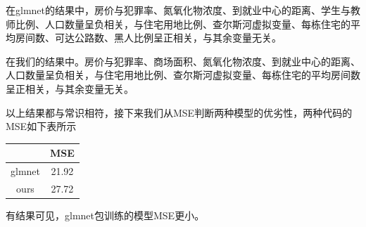     在glmnet的结果中，房价与犯罪率、氮氧化物浓度、到就业中心的距离、学生与教师比例、人口数量呈负相关，与住宅用地比例、查尔斯河虚拟变量、每栋住宅的平均房间数、可达公路数、黑人比例呈正相关，与其余变量无关。

    在我们的结果中。房价与犯罪率、商场面积、氮氧化物浓度、到就业中心的距离、人口数量呈负相关，与住宅用地比例、查尔斯河虚拟变量、每栋住宅的平均房间数呈正相关，与其余变量无关。

    以上结果都与常识相符，接下来我们从MSE判断两种模型的优劣性，两种代码的MSE如下表所示
    \begin{table}[]
        \begin{tabular}{|c|c|}
        \hline
               & MSE   \\ \hline
        glmnet & 21.92 \\ \hline
        ours   & 27.72 \\ \hline
        \end{tabular}
    \end{table}
    有结果可见，glmnet包训练的模型MSE更小。
